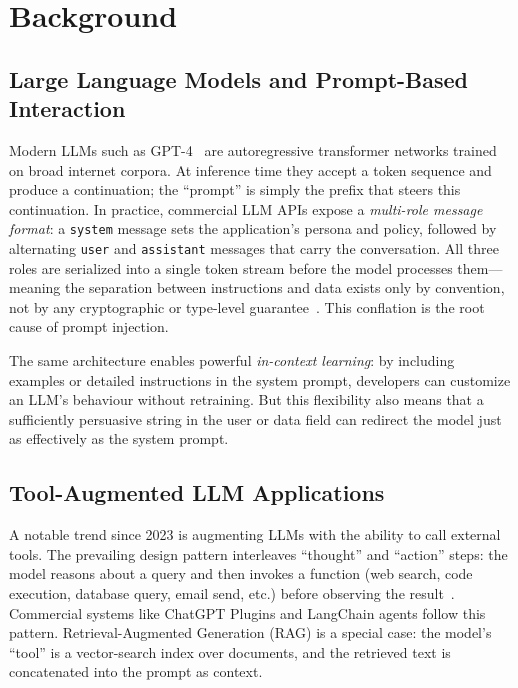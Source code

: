 \section{Background}
\label{sec:bg}

\subsection{Large Language Models and Prompt-Based Interaction}

Modern LLMs such as GPT-4~\cite{achiam2023gpt4} are autoregressive transformer networks trained on broad internet corpora. At inference time they accept a token sequence and produce a continuation; the ``prompt'' is simply the prefix that steers this continuation. In practice, commercial LLM APIs expose a \emph{multi-role message format}: a \texttt{system} message sets the application's persona and policy, followed by alternating \texttt{user} and \texttt{assistant} messages that carry the conversation. All three roles are serialized into a single token stream before the model processes them---meaning the separation between instructions and data exists only by convention, not by any cryptographic or type-level guarantee~\cite{liu2024prompt}. This conflation is the root cause of prompt injection.

The same architecture enables powerful \emph{in-context learning}: by including examples or detailed instructions in the system prompt, developers can customize an LLM's behaviour without retraining. But this flexibility also means that a sufficiently persuasive string in the user or data field can redirect the model just as effectively as the system prompt.

\subsection{Tool-Augmented LLM Applications}

A notable trend since 2023 is augmenting LLMs with the ability to call external tools. The prevailing design pattern interleaves ``thought'' and ``action'' steps: the model reasons about a query and then invokes a function (web search, code execution, database query, email send, etc.) before observing the result~\cite{ruan2024toolemu}. Commercial systems like ChatGPT Plugins and LangChain agents follow this pattern. Retrieval-Augmented Generation (RAG) is a special case: the model's ``tool'' is a vector-search index over documents, and the retrieved text is concatenated into the prompt as context.

